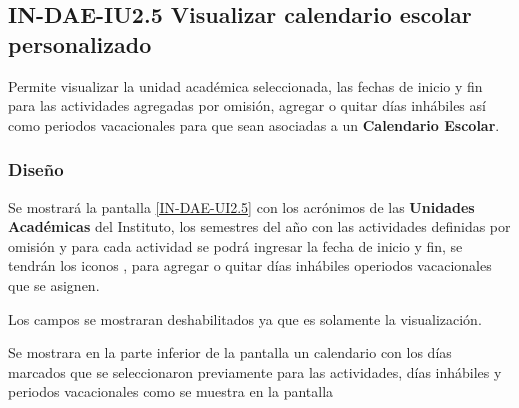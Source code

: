 \subsection{IN-DAE-IU2.5 Visualizar calendario escolar personalizado}

		Permite visualizar la unidad académica seleccionada, las fechas de inicio y fin para las actividades agregadas por omisión, agregar o quitar días inhábiles así como periodos vacacionales para que sean asociadas a un \textbf{Calendario Escolar}. 
	
	\subsubsection{Diseño}
	
	Se mostrará la pantalla \ref{IN-DAE-UI2.5} con los acrónimos de las \textbf{Unidades Académicas} del Instituto, los semestres del año con las actividades definidas por omisión y para cada actividad se podrá ingresar la fecha de inicio y fin, se tendrán los iconos \IUAdd, \IUMenos para agregar o quitar días inhábiles operiodos vacacionales que se asignen.
	
	Los campos se mostraran deshabilitados ya que es solamente la visualización.  
	
	
	
	Se mostrara en la parte inferior de la pantalla un calendario con los días marcados que se seleccionaron previamente para las actividades, días inhábiles y periodos vacacionales como se muestra en la pantalla 
	







